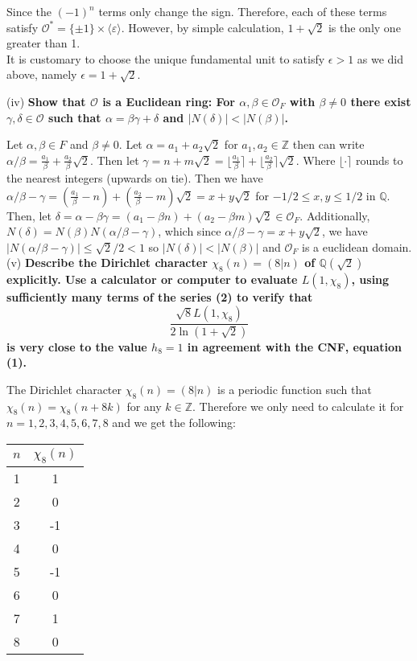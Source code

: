 \documentclass[12pt]{amsart}
\theoremstyle{definition}
\theoremstyle{remark}
\begin{document}
Since the $(-1)^n$ terms only change the sign. Therefore, each of these terms satisfy $\mathcal{O}^* = \{\pm 1\} \times \langle \varepsilon \rangle$. However, by simple calculation, $1+\sqrt{2}$ is the only one greater than 1.\\

It is customary to choose the unique fundamental unit to satisfy $\epsilon>1$ as we did above, namely $\epsilon = 1 + \sqrt{2}$.

\qquad(iv) \textbf{Show that $\mathcal{O}$ is a Euclidean ring: For $\alpha, \beta \in \mathcal{O}_F$ with $\beta \not= 0$ there exist $\gamma, \delta \in \mathcal{O}$ such that $\alpha = \beta\gamma + \delta$ and
$|N(\delta)| < |N(\beta)|$.}

Let $\alpha,\beta\in F$ and $\beta \not = 0$. Let $\alpha = a_1 + a_2\sqrt{2}$ for $a_1,a_2\in\mathbb{Z}$ then can write $\alpha/\beta = \frac{a_1}{\beta} + \frac{a_2}{\beta}\sqrt{2}$. Then let $\gamma = n + m\sqrt{2} = \lfloor \frac{a_1}{\beta}\rceil +\lfloor \frac{a_2}{\beta}\rceil \sqrt{2}$. Where $\lfloor \cdot \rceil$ rounds to the nearest integers (upwards on tie). Then we have $\alpha/\beta - \gamma = (\frac{a_1}{\beta}-n) + (\frac{a_2}{\beta}-m)\sqrt{2} = x + y\sqrt{2}$ for $-1/2 \leq x,y\leq 1/2$ in $\mathbb{Q}$. 
Then, let $\delta = \alpha - \beta\gamma = (a_1 - \beta n) + (a_2 - \beta m)\sqrt{2} \in \mathcal{O}_F$. Additionally, $N(\delta) = N(\beta)N(\alpha/\beta - \gamma)$, which since $\alpha/\beta - \gamma = x + y\sqrt{2}$, we have $|N(\alpha/\beta - \gamma)| \leq \sqrt{2}/2 < 1$ so $|N(\delta)| < |N(\beta)|$ and $\mathcal{O}_F$ is a euclidean domain.\\

\qquad(v) \textbf{Describe the Dirichlet character $\chi_8(n) = (8|n)$ of $\mathbb{Q}(\sqrt{2})$ explicitly. Use a calculator or computer to evaluate $L(1,\chi_8)$, using sufficiently many terms of the series (2) to verify that
$$\frac{\sqrt{8} L(1,\chi_8)}{2\ln(1+\sqrt{2})}$$ is very close to the value $h_8 = 1$ in agreement with the CNF, equation (1).}

    The Dirichlet character $\chi_8(n) = (8 | n)$ is a periodic function such that $\chi_8(n) = \chi_8(n + 8k)$ for any $k\in\mathbb{Z}$. Therefore we only need to calculate it for $n = 1,2,3,4,5,6,7,8$ and we get the following:
\begin{center}
    \begin{tabular}{c|c}
        $n$ & $\chi_8(n)$ \\ \hline
        1 & 1 \\ 
        2 & 0 \\
        3 & -1\\
        4 & 0\\
        5 & -1\\
        6 & 0\\
        7 & 1\\
        8 & 0
    \end{tabular}
\end{center}
    
\end{document}
